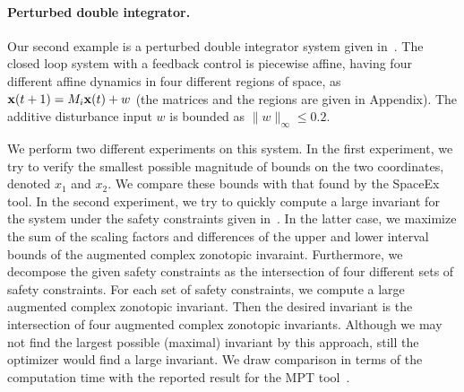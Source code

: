 \paragraph{Perturbed double integrator.}
Our second example is a perturbed double integrator system given
in~\cite{rakovic2004computation}.  The closed loop system with a
feedback control is piecewise affine, having four different affine
dynamics in four different regions of space, as
${\bf x}(t+1)=M_i{\bf x}(t)+w$ (the matrices and the regions are given in Appendix).
%
The additive disturbance input $w$ is bounded as $\|w\|_{\infty}\leq
0.2$.  

We perform two different experiments on this system.  In the first
experiment, we try to verify the smallest possible magnitude of bounds
on the two coordinates, denoted $x_1$ and $x_2$. We compare these
bounds with that found by the SpaceEx tool.  In the second experiment,
we try to quickly compute a large invariant for the system under the
safety constraints given in~\cite{rakovic2004computation}.  %
In the latter case, we maximize the sum of the scaling factors and
differences of the upper and lower interval bounds of the augmented
complex zonotopic invaraint.  Furthermore, we decompose the given
safety constraints as the intersection of four different sets of
safety constraints.  For each set of safety constraints, we compute a
large augmented complex zonotopic invariant.  Then the desired
invariant is the intersection of four augmented complex zonotopic
invariants.  Although we may not find the largest possible (maximal)
invariant by this approach, still the optimizer would find a large
invariant.  We draw comparison in terms of the computation time with
the reported result for the MPT tool~\cite{rakovic2004computation}.


